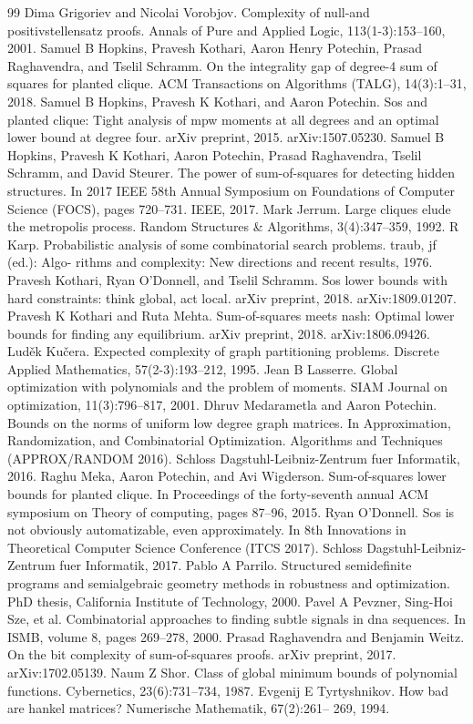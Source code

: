 \documentclass[10pt,a4paper]{article}
\begin{document}
\begin{thebibliography}{99}
 Dima Grigoriev and Nicolai Vorobjov. Complexity of null-and positivstellensatz proofs. Annals of Pure and Applied Logic, 113(1-3):153–160, 2001.
 Samuel B Hopkins, Pravesh Kothari, Aaron Henry Potechin, Prasad Raghavendra, and Tselil Schramm. On the integrality gap of degree-4 sum of squares for planted clique. ACM Transactions on Algorithms (TALG), 14(3):1–31, 2018.
 Samuel B Hopkins, Pravesh K Kothari, and Aaron Potechin. Sos and planted clique: Tight analysis of mpw moments at all degrees and an optimal lower bound at degree four. arXiv preprint, 2015. arXiv:1507.05230.
 Samuel B Hopkins, Pravesh K Kothari, Aaron Potechin, Prasad Raghavendra, Tselil Schramm, and David Steurer. The power of sum-of-squares for detecting hidden structures. In 2017 IEEE 58th Annual Symposium on Foundations of Computer Science (FOCS), pages 720–731. IEEE, 2017.
 Mark Jerrum. Large cliques elude the metropolis process. Random Structures \& Algorithms, 3(4):347–359, 1992.
 R Karp. Probabilistic analysis of some combinatorial search problems. traub, jf (ed.): Algo- rithms and complexity: New directions and recent results, 1976.
 Pravesh Kothari, Ryan O’Donnell, and Tselil Schramm. Sos lower bounds with hard constraints: think global, act local. arXiv preprint, 2018. arXiv:1809.01207.
 Pravesh K Kothari and Ruta Mehta. Sum-of-squares meets nash: Optimal lower bounds for finding any equilibrium. arXiv preprint, 2018. arXiv:1806.09426.
 Luděk Kučera. Expected complexity of graph partitioning problems. Discrete Applied Mathematics, 57(2-3):193–212, 1995.
 Jean B Lasserre. Global optimization with polynomials and the problem of moments. SIAM Journal on optimization, 11(3):796–817, 2001.
 Dhruv Medarametla and Aaron Potechin. Bounds on the norms of uniform low degree graph matrices. In Approximation, Randomization, and Combinatorial Optimization. Algorithms and Techniques (APPROX/RANDOM 2016). Schloss Dagstuhl-Leibniz-Zentrum fuer Informatik, 2016.
 Raghu Meka, Aaron Potechin, and Avi Wigderson. Sum-of-squares lower bounds for planted clique. In Proceedings of the forty-seventh annual ACM symposium on Theory of computing, pages 87–96, 2015.
 Ryan O’Donnell. Sos is not obviously automatizable, even approximately. In 8th Innovations in Theoretical Computer Science Conference (ITCS 2017). Schloss Dagstuhl-Leibniz-Zentrum fuer Informatik, 2017.
 Pablo A Parrilo. Structured semidefinite programs and semialgebraic geometry methods in robustness and optimization. PhD thesis, California Institute of Technology, 2000.
 Pavel A Pevzner, Sing-Hoi Sze, et al. Combinatorial approaches to finding subtle signals in dna sequences. In ISMB, volume 8, pages 269–278, 2000.
 Prasad Raghavendra and Benjamin Weitz. On the bit complexity of sum-of-squares proofs. arXiv preprint, 2017. arXiv:1702.05139.
 Naum Z Shor. Class of global minimum bounds of polynomial functions. Cybernetics, 23(6):731–734, 1987.
 Evgenij E Tyrtyshnikov. How bad are hankel matrices? Numerische Mathematik, 67(2):261– 269, 1994.
\end{thebibliography}
\end{document}
